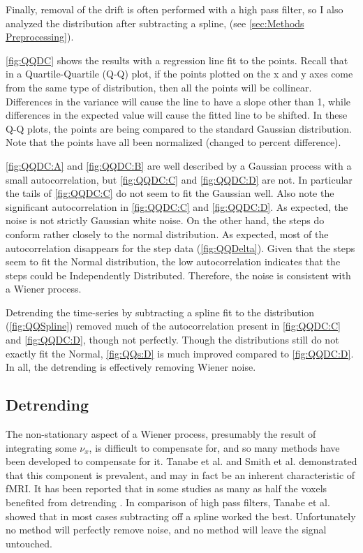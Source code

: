 Finally, removal of the drift is often performed with a high pass filter,
so I also analyzed the distribution after subtracting a spline, (see \autoref{sec:Methods Preprocessing}).

\autoref{fig:QQDC} shows the
results with a regression line fit to the points.
Recall that in a Quartile-Quartile (Q-Q) plot, if the points plotted on the
x and y axes come from the same type of distribution, then all the points will
be collinear. Differences in the variance will cause the line to have a slope
other than 1, while differences in the expected value will cause the fitted line
to be shifted. In these Q-Q plots, the points are being compared to the standard
Gaussian distribution. Note that the points have all been
normalized (changed to percent difference).

\autoref{fig:QQDC:A} and \autoref{fig:QQDC:B}
are well described by a Gaussian process with a small autocorrelation, but
\autoref{fig:QQDC:C} and \autoref{fig:QQDC:D} are not. In particular the tails of \autoref{fig:QQDC:C}
do not seem to fit the Gaussian well. Also note the significant autocorrelation in
\autoref{fig:QQDC:C} and \autoref{fig:QQDC:D}. As expected, the noise is not strictly
Gaussian white noise.  On the other hand, the steps do conform rather
closely to the normal distribution.
As expected, most of the autocorrelation disappears for the step data
(\autoref{fig:QQDelta}). Given
that the steps seem to fit the Normal distribution, the low autocorrelation
indicates that the steps could be Independently Distributed.
Therefore, the noise is consistent with a Wiener process.

Detrending the time-series by subtracting a spline fit to the distribution
(\autoref{fig:QQSpline})
removed much of the autocorrelation present in \autoref{fig:QQDC:C} and 
\autoref{fig:QQDC:D},
though not perfectly. Though the distributions still do not exactly fit
the Normal, \autoref{fig:QQs:D} is much improved compared to \autoref{fig:QQDC:D}.
In all, the detrending is effectively removing Wiener noise.

\subsection{Detrending}
\label{sec:Detrend}
The non-stationary
aspect of a Wiener process, presumably the result of integrating some
$\nu_x$, is difficult to compensate for, and so many methods
have been developed to compensate for it. Tanabe et al. \cite{Tanabe2002}
and Smith et al. \cite{Smith1999}
demonstrated that this component is prevalent, and may in fact be an inherent  characteristic
of \ac{fMRI}. It has been reported that in some studies as
many as half the voxels
benefited from detrending \cite{Smith2007}. In comparison of high pass 
filters, 
Tanabe et al. \cite{Tanabe2002} showed that in most cases subtracting off
a spline worked the best.
Unfortunately no method will
perfectly remove noise, and no method will leave the signal untouched.

